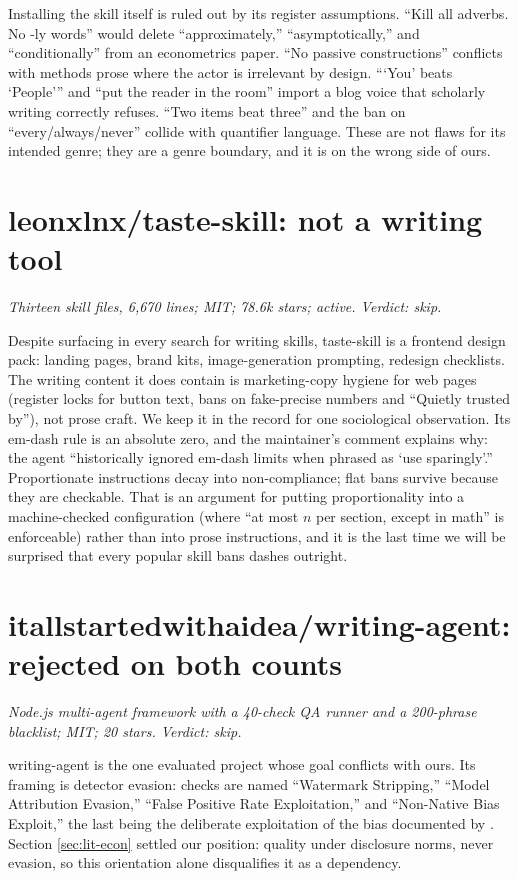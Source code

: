 Installing the skill itself is ruled out by its register assumptions. ``Kill
all adverbs. No -ly words'' would delete ``approximately,''
``asymptotically,'' and ``conditionally'' from an econometrics paper. ``No
passive constructions'' conflicts with methods prose where the actor is
irrelevant by design. ```You' beats `People''' and ``put the reader in the
room'' import a blog voice that scholarly writing correctly refuses. ``Two
items beat three'' and the ban on ``every/always/never'' collide with
quantifier language. These are not flaws for its intended genre; they are a
genre boundary, and it is on the wrong side of ours.

\section{leonxlnx/taste-skill: not a writing tool}
\label{sec:oss-taste}

\emph{Thirteen skill files, 6{,}670 lines; MIT; 78.6k stars; active.
Verdict: skip.}

Despite surfacing in every search for writing skills, taste-skill is a
frontend design pack: landing pages, brand kits, image-generation prompting,
redesign checklists. The writing content it does contain is
marketing-copy hygiene for web pages (register locks for button text, bans
on fake-precise numbers and ``Quietly trusted by''), not prose craft. We
keep it in the record for one sociological observation. Its em-dash rule is
an absolute zero, and the maintainer's comment explains why: the agent
``historically ignored em-dash limits when phrased as `use sparingly'.''
Proportionate instructions decay into non-compliance; flat bans survive
because they are checkable. That is an argument for putting proportionality
into a machine-checked configuration (where ``at most $n$ per section,
except in math'' is enforceable) rather than into prose instructions, and it
is the last time we will be surprised that every popular skill bans dashes
outright.

\section{itallstartedwithaidea/writing-agent: rejected on both counts}
\label{sec:oss-writingagent}

\emph{Node.js multi-agent framework with a 40-check QA runner and a
200-phrase blacklist; MIT; 20 stars. Verdict: skip.}

writing-agent is the one evaluated project whose goal conflicts with ours.
Its framing is detector evasion: checks are named ``Watermark Stripping,''
``Model Attribution Evasion,'' ``False Positive Rate Exploitation,'' and
``Non-Native Bias Exploit,'' the last being the deliberate exploitation of
the bias documented by \citet{liang2023detectors}. Section
\ref{sec:lit-econ} settled our position: quality under disclosure norms,
never evasion, so this orientation alone disqualifies it as a dependency.

